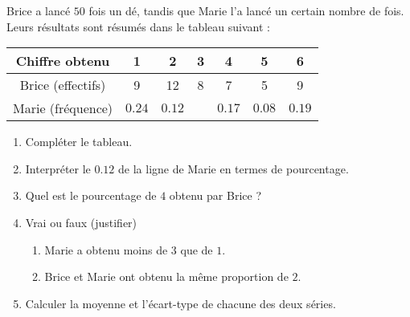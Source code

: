 
\begin{exercice}\label{exosmath-0216}

    Brice a lancé \( 50\) fois un dé, tandis que Marie l'a lancé un certain nombre de fois. Leurs résultats sont résumés dans le tableau suivant :
    \begin{center}
        \begin{tabular}[]{|c||c|c|c|c|c|c|}
            \hline
            Chiffre obtenu&1&2&3&4&5&6\\
            \hline\hline
            Brice (effectifs)&9&12&8&7&5&9\\
            \hline
            Marie (fréquence)&$0.24$&$0.12$&&$0.17$&$0.08$&$0.19$\\
            \hline
        \end{tabular}
    \end{center}
    \begin{enumerate}
        \item
            Compléter le tableau.
        \item
            Interpréter le \( 0.12\) de la ligne de Marie en termes de pourcentage.
            \item
                Quel est le pourcentage de $4$ obtenu par Brice ?
        \item
            Vrai ou faux (justifier)
            \begin{enumerate}
                \item
                    Marie a obtenu moins de \( 3\) que de \( 1\).
                \item
                    Brice et Marie ont obtenu la même proportion de \( 2\).
            \end{enumerate}
        \item
            Calculer la moyenne et l'écart-type de chacune des deux séries.
    \end{enumerate}

\end{exercice}
